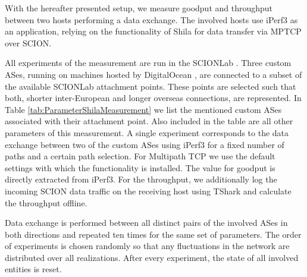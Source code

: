 With the hereafter presented setup, we measure goodput and throughput between two hosts performing a data exchange. The involved hosts use iPerf3 as an application, relying on the functionality of Shila for data transfer via MPTCP over SCION. 

All experiments of the measurement are run in the SCIONLab \cite{SCIOLab}. Three custom ASes, running on machines hosted by DigitalOcean \cite{DigitalOcean}, are connected to a subset of the available SCIONLab attachment points. These points are selected such that both, shorter inter-European and longer overseas connections, are represented. In Table \ref{tab:ParameterShilaMeasurement} we list the mentioned custom ASes associated with their attachment point. Also included in the table are all other parameters of this measurement. A single experiment corresponds to the data exchange between two of the custom ASes using iPerf3 for a fixed number of paths and a certain path selection. For Multipath TCP we use the default settings with which the functionality is installed. The value for goodput is directly extracted from iPerf3. For the throughput, we additionally log the incoming SCION data traffic on the receiving host using TShark \cite{tshark} and calculate the throughput offline. 

Data exchange is performed between all distinct pairs of the involved ASes in both directions and repeated ten times for the same set of parameters. The order of experiments is chosen randomly so that any fluctuations in the network are distributed over all realizations. After every experiment, the state of all involved entities is reset.

